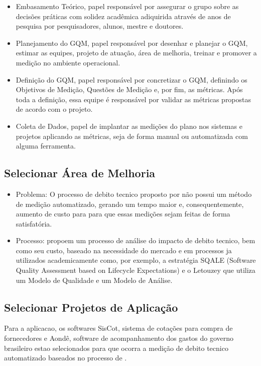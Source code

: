 \begin{itemize}
  \item Embasamento Teórico, papel responsável por assegurar o grupo sobre as decisões
  práticas com solidez acadêmica adiquirida através de anos de pesquisa por pesquisadores,
  alunos, mestre e doutores.

  \item Planejamento do GQM, papel responsável por desenhar e planejar o GQM, estimar
  as equipes, projeto de atuação, área de melhoria, treinar e promover a medição
  no ambiente operacional.

  \item Definição do GQM, papel responsável por concretizar o GQM, definindo os
  Objetivos de Medição, Questões de Medição e, por fim, as métricas. Após toda a
  definição, essa equipe é responsável por validar as métricas propostas de acordo
  com o projeto.

  \item Coleta de Dados, papel de implantar as medições do plano nos sistemas e
  projetos aplicando as métricas, seja de forma manual ou automatizada com alguma
  ferramenta.
\end{itemize}

\subsection{Selecionar Área de Melhoria}
\begin{itemize}
  \item Problema: O processo de debito tecnico proposto por  \cite{td} não possui
  um método de medição automatizado, gerando um tempo maior e, consequentemente, aumento de custo
  para para que essas medições sejam feitas de forma satisfatória.

  \item Processo: \cite{td} propoem um processo de análise do impacto de debito tecnico,
  bem como seu custo, baseado na necessidade do mercado e em processos ja utilizados academicamente como,
  por exemplo, a estratégia SQALE (Software Quality Assessment based on Lifecycle Expectations) e o
  Letouzey que utiliza um Modelo de Qualidade e um Modelo de Análise.
\end{itemize}
\subsection{Selecionar Projetos de Aplicação}
Para a aplicacao, os softwares SisCot, sistema de cotações para compra de fornecedores e Aondê, software
de acompanhamento dos gastos do governo brasileiro estao selecionados para que ocorra a medição
de debito tecnico automatizado baseados no processo de \cite{td}.
